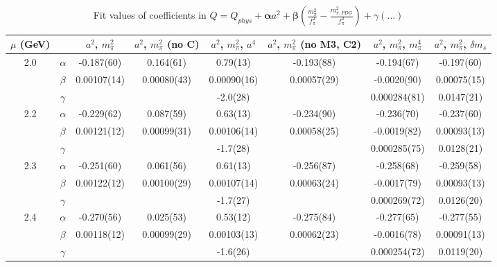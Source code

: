 \documentclass[12pt]{extarticle}
\begin{document}
\begin{table}[h!]
\begin{center}
\begin{tabular}{|c c|c|c|c|c|c|c|}
\hline
$\mu$ (GeV) &  & $a^2$, $m_\pi^2$& $a^2$, $m_\pi^2$ (no C)& $a^2$, $m_\pi^2$, $a^4$& $a^2$, $m_\pi^2$ (no M3, C2)& $a^2$, $m_\pi^2$, $m_\pi^4$& $a^2$, $m_\pi^2$, $\delta m_s$\\
\hline
\multirow{3}{0.5in}{2.0} & $\alpha$ & -0.187(60)& 0.164(61)& 0.79(13)& -0.193(88)& -0.194(67)& -0.197(60)\\
 & $\beta$ & 0.00107(14)& 0.00080(43)& 0.00090(16)& 0.00057(29)& -0.0020(90)& 0.00075(15)\\
 & $\gamma$ &  &  & -2.0(28)&  & 0.000284(81)& 0.0147(21)\\
\hline
\multirow{3}{0.5in}{2.2} & $\alpha$ & -0.229(62)& 0.087(59)& 0.63(13)& -0.234(90)& -0.236(70)& -0.237(60)\\
 & $\beta$ & 0.00121(12)& 0.00099(31)& 0.00106(14)& 0.00058(25)& -0.0019(82)& 0.00093(13)\\
 & $\gamma$ &  &  & -1.7(28)&  & 0.000285(75)& 0.0128(21)\\
\hline
\multirow{3}{0.5in}{2.3} & $\alpha$ & -0.251(60)& 0.061(56)& 0.61(13)& -0.256(87)& -0.258(68)& -0.259(58)\\
 & $\beta$ & 0.00122(12)& 0.00100(29)& 0.00107(14)& 0.00063(24)& -0.0017(79)& 0.00093(13)\\
 & $\gamma$ &  &  & -1.7(27)&  & 0.000269(72)& 0.0126(20)\\
\hline
\multirow{3}{0.5in}{2.4} & $\alpha$ & -0.270(56)& 0.025(53)& 0.53(12)& -0.275(84)& -0.277(65)& -0.277(55)\\
 & $\beta$ & 0.00118(12)& 0.00099(29)& 0.00103(13)& 0.00062(23)& -0.0016(78)& 0.00091(13)\\
 & $\gamma$ &  &  & -1.6(26)&  & 0.000254(72)& 0.0119(20)\\
\hline
\end{tabular}
\caption{Fit values of coefficients in $Q = Q_{phys} + \mathbf{\alpha} a^2 + \mathbf{\beta}\left(\frac{m_\pi^2}{f_\pi^2}-\frac{m_{\pi,PDG}^2}{f_\pi^2}\right) + \gamma(\ldots)$}
\end{center}
\end{table}






\end{document}
